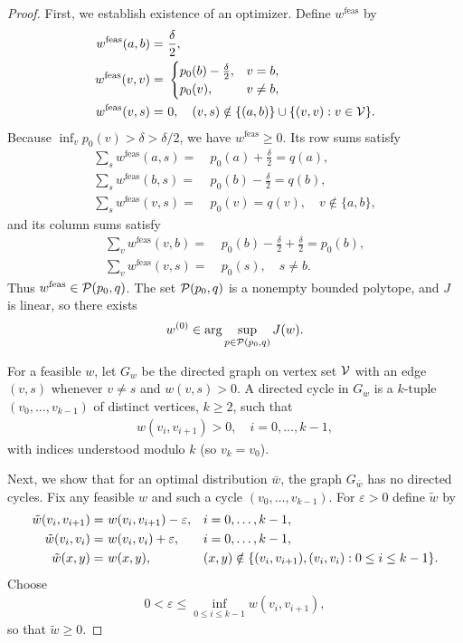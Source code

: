\begin{proof} First, we establish existence of an optimizer. Define $w^{\mathrm{feas}}$ by
\begin{align*}
    w^{\mathrm{feas}}(a,b) = &~ \frac{\delta}{2},\\
    w^{\mathrm{feas}}(v,v) = &~ 
    \begin{cases}
        p_0(b) - \frac{\delta}{2}, & v=b,\\
        p_0(v), & v\neq b,
    \end{cases}\\
    w^{\mathrm{feas}}(v,s) = &~ 0, \quad (v,s)\notin\{(a,b)\}\cup\{(v,v):v\in\mathcal{V}\}.
\end{align*}
Because $\inf_v p_0(v)>\delta>\delta/2$, we have $w^{\mathrm{feas}}\ge0$.  
Its row sums satisfy
\begin{align*}
    \sum_s w^{\mathrm{feas}}(a,s) = &~ p_0(a)+\frac{\delta}{2} = q(a),\\
    \sum_s w^{\mathrm{feas}}(b,s) = &~ p_0(b)-\frac{\delta}{2} = q(b),\\
    \sum_s w^{\mathrm{feas}}(v,s) = &~ p_0(v) = q(v), \quad v\notin\{a,b\},
\end{align*}
and its column sums satisfy
\begin{align*}
    \sum_v w^{\mathrm{feas}}(v,b) = &~ p_0(b)-\frac{\delta}{2} + \frac{\delta}{2} = p_0(b),\\
    \sum_v w^{\mathrm{feas}}(v,s) = &~ p_0(s), \quad s\neq b.
\end{align*}
Thus $w^{\mathrm{feas}}\in\mathcal{P}(p_0,q)$. The set $\mathcal{P}(p_0,q)$ is a nonempty bounded polytope, and $J$ is linear, so there exists
\begin{align*}
    w^{(0)} \in \arg\sup_{p\in\mathcal{P}(p_0,q)} J(w).
\end{align*}

\medskip
For a feasible $w$, let $G_w$ be the directed graph on vertex set $\mathcal{V}$ with an edge
$(v,s)$ whenever $v\neq s$ and $w(v,s)>0$.
A directed cycle in $G_w$ is a $k$-tuple $(v_0,\dots,v_{k-1})$ of distinct vertices,
$k\ge2$, such that
\begin{align*}
    w(v_i,v_{i+1})>0,\quad i=0,\dots,k-1,
\end{align*}
with indices understood modulo $k$ (so $v_k=v_0$).

Next, we show that for an optimal distribution $\bar{w}$, the graph $G_{\bar{w}}$ has no directed cycles. Fix any feasible $w$ and such a cycle $(v_0,\dots,v_{k-1})$.
For $\varepsilon>0$ define $\tilde w$ by
\begin{align}
    \tilde w(v_i,v_{i+1}) = &~ w(v_i,v_{i+1}) - \varepsilon,
    &&i=0,\dots,k-1,
    \label{eq:cycle-transform-off}\\
    \tilde w(v_i,v_i)     = &~ w(v_i,v_i) + \varepsilon,
    &&i=0,\dots,k-1,
    \label{eq:cycle-transform-diag}\\
    \tilde w(x,y)         = &~ w(x,y),
    &&(x,y)\notin\{(v_i,v_{i+1}),(v_i,v_i):0\le i\le k-1\}.
    \notag
\end{align}
Choose
\begin{align*}
    0<\varepsilon\le\inf_{0\le i\le k-1} w(v_i,v_{i+1}),
\end{align*}
so that $\tilde w\ge0$.


\end{proof}
